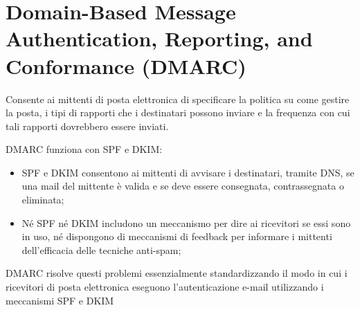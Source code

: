 \section{Domain-Based Message Authentication, Reporting, and Conformance (DMARC)}

Consente ai mittenti di posta elettronica di specificare la politica su come gestire la posta, i tipi di rapporti che i destinatari possono inviare e la frequenza con cui tali rapporti dovrebbero essere inviati.

DMARC funziona con SPF e DKIM:
\begin{itemize}
    \item SPF e DKIM consentono ai mittenti di avvisare i destinatari, tramite DNS, se una mail del mittente è valida e se deve essere consegnata, contrassegnata o eliminata;
	\item Né SPF né DKIM includono un meccanismo per dire ai ricevitori se essi sono in uso, né dispongono di meccanismi di feedback per informare i mittenti dell'efficacia delle tecniche anti-spam;
\end{itemize}

DMARC risolve questi problemi essenzialmente standardizzando il modo in cui i ricevitori di posta elettronica eseguono l'autenticazione e-mail utilizzando i meccanismi SPF e DKIM

